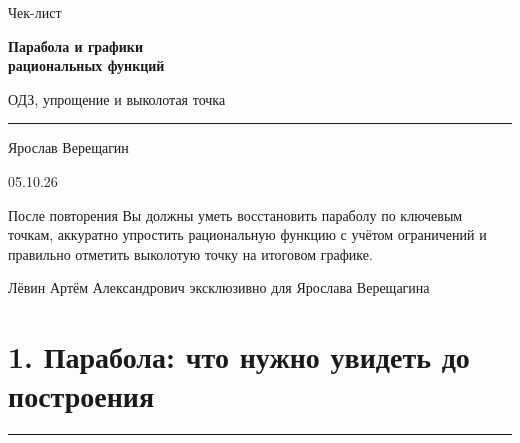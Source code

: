 \documentclass[a4paper,12pt]{article}
\newcommand{\sectionrule}{\vspace{-0.4em}\noindent\color{rulegray}\rule{\linewidth}{0.6pt}\color{textgray}\vspace{0.4em}}
\begin{document}
\color{textgray}

\begin{titlepage}
\thispagestyle{empty}
\centering
\vspace*{24mm}

{\large\color{softgray}Чек-лист}\par
\vspace{5mm}
{\Huge\bfseries\color{darkaccent}Парабола и графики\\[2mm]рациональных функций}\par
\vspace{5mm}
{\Large\color{accent}ОДЗ, упрощение и выколотая точка}\par

\vspace{14mm}
\rule{0.68\linewidth}{0.7pt}\par
\vspace{9mm}

{\large Ярослав Верещагин}\par
\vspace{2mm}
{\normalsize 05.10.26}\par

\vfill

\begin{minipage}{0.80\linewidth}
\centering
\small
После повторения Вы должны уметь восстановить параболу по ключевым точкам, аккуратно упростить рациональную функцию с учётом ограничений и правильно отметить выколотую точку на итоговом графике.
\end{minipage}

\vfill

{\small\color{softgray}Лёвин Артём Александрович эксклюзивно для Ярослава Верещагина}\par
\vspace{9mm}

\end{titlepage}

\section*{1. Парабола: что нужно увидеть до построения}
\sectionrule
\end{document}
